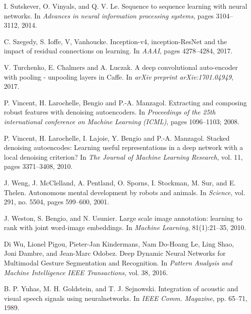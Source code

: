 \begin{thebibliography}{99}
  I. Sutskever, O. Vinyals, and Q. V. Le. Sequence to sequence learning
  with neural networks. In \textit{Advances in neural information
  processing systems}, pages 3104--3112, 2014.

  C. Szegedy, S. Ioffe, V, Vanhoucke. Inception-v4, inception-ResNet and the
  impact of residual connections on learning. In \textit{AAAI},
  pages 4278--4284, 2017.

  V. Turchenko, E. Chalmers and A. Luczak. A deep convolutional auto-encoder
  with pooling - unpooling layers in Caffe. In \textit{arXiv preprint
  arXiv:1701.04949}, 2017.

  P. Vincent, H. Larochelle, Bengio and P.-A. Manzagol.
  Extracting and composing robust features with denoising autoencoders.
  In \textit{Proceedings of the 25th international conference
  on Machine Learning (ICML)}, pages 1096--1103; 2008.

  P. Vincent, H. Larochelle, I. Lajoie, Y. Bengio and P.-A. Manzagol.
  Stacked denoising autoencodes: Learning useful representations in a
  deep network with a local denoising criterion? In \textit{The Journal
  of Machine Learning Research}, vol. 11, pages 3371--3408, 2010.

J. Weng, J. McClelland, A. Pentland, O. Sporns, I. Stockman, M. Sur,
and E. Thelen. Autonomous mental development by robots and animals.
In \textit{Science}, vol. 291, no. 5504, pages 599–600, 2001.

  J. Weston, S. Bengio, and N. Usunier. 
  Large scale image annotation: learning to rank with joint word-image
  embeddings. In \textit{Machine Learning}, 81(1):21--35, 2010.

  Di Wu, Lionel Pigou, Pieter-Jan Kindermans, Nam Do-Hoang Le, Ling Shao,
  Joni Dambre, and Jean-Marc Odobez. 
  Deep Dynamic Neural Networks for Multimodal Gesture Segmentation and
  Recognition. In \textit{Pattern Analysis and Machine Intelligence
  IEEE Transactions}, vol. 38, 2016.

  B. P. Yuhas, M. H. Goldstein, and T. J. Sejnowski. Integration of acoustic
  and visual speech signals using neuralnetworks. In \textit{IEEE Comm.
  Magazine}, pp. 65--71, 1989.

\end{thebibliography}
